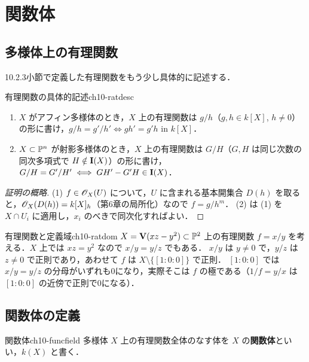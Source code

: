 \section{関数体}

\subsection{多様体上の有理関数}

10.2.3小節で定義した有理関数をもう少し具体的に記述する．

\begin{myprop}{有理関数の具体的記述}{ch10-ratdesc}
\begin{enumerate}
  \item $X$ がアフィン多様体のとき，$X$ 上の有理関数は $g/h$（$g,h\in k[X]$, $h\neq0$）の形に書け，$g/h=g'/h'\iff gh'=g'h$ in $k[X]$．
  \item $X\subset\mathbb{P}^n$ が射影多様体のとき，$X$ 上の有理関数は $G/H$（$G,H$ は同じ次数の同次多項式で $H\notin\mathbf{I}(X)$）の形に書け，$G/H=G'/H'\iff GH'-G'H\in\mathbf{I}(X)$．
\end{enumerate}
\end{myprop}

\begin{proof}[証明の概略]
(1) $f\in\mathscr{O}_X(U)$ について，$U$ に含まれる基本開集合 $D(h)$ を取ると，$\mathscr{O}_X(D(h))=k[X]_h$（第6章の局所化）なので $f=g/h^m$．
(2) は (1) を $X\cap U_i$ に適用し，$x_i$ のべきで同次化すればよい．
\end{proof}

\begin{myex}{有理関数と定義域}{ch10-ratdom}
$X=\mathbf{V}(xz-y^2)\subset\mathbb{P}^2$ 上の有理関数 $f=x/y$ を考える．$X$ 上では $xz=y^2$ なので $x/y=y/z$ でもある．
$x/y$ は $y\neq0$ で，$y/z$ は $z\neq0$ で正則であり，あわせて $f$ は $X\setminus\{[1:0:0]\}$ で正則．
$[1:0:0]$ では $x/y=y/z$ の分母がいずれも0になり，実際そこは $f$ の極である（$1/f=y/x$ は $[1:0:0]$ の近傍で正則で0になる）．
\end{myex}

\subsection{関数体の定義}

\begin{mydef}{関数体}{ch10-funcfield}
多様体 $X$ 上の有理関数全体のなす体を $X$ の\textbf{関数体}といい，$k(X)$ と書く．
\end{mydef}

